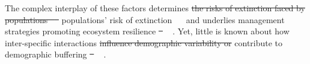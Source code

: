 \documentclass[lineno, sn-basic]{sn-jnl}%
\providecommand{\DIFadd}[1]{{\protect\color{blue}#1}} %
\providecommand{\DIFdel}[1]{{\protect\color{red}\protect\scriptsize\sout{#1}}}
\providecommand{\DIFadd}[1]{{\protect\color{blue}\uwave{#1}}} %
\providecommand{\DIFdel}[1]{{\protect\color{red}\sout{#1}}}                      %
\providecommand{\DIFaddbegin}{} %
\providecommand{\DIFaddend}{} %
\providecommand{\DIFdelbegin}{} %
\providecommand{\DIFdelend}{} %
\newcommand{\DIFscaledelfig}{0.5}
\newlength{\DIFdelgraphicswidth} %
\newlength{\DIFdelgraphicsheight} %
\newcommand{\DIFaddincludegraphics}[2][]{{\color{blue}\fbox{\DIFOincludegraphics[#1]{#2}}}} %
\newcommand{\DIFdelincludegraphics}[2][]{%
\sbox{\DIFdelgraphicsbox}{\DIFOincludegraphics[#1]{#2}}%
\settoboxwidth{\DIFdelgraphicswidth}{\DIFdelgraphicsbox} %
\settoboxtotalheight{\DIFdelgraphicsheight}{\DIFdelgraphicsbox} %
\scalebox{\DIFscaledelfig}{%
\parbox[b]{\DIFdelgraphicswidth}{\usebox{\DIFdelgraphicsbox}\\[-\baselineskip] \rule{\DIFdelgraphicswidth}{0em}}\llap{\resizebox{\DIFdelgraphicswidth}{\DIFdelgraphicsheight}{%
\setlength{\unitlength}{\DIFdelgraphicswidth}%
\begin{picture}(1,1)%
\thicklines\linethickness{2pt} %
{\color[rgb]{1,0,0}\put(0,0){\framebox(1,1){}}}%
{\color[rgb]{1,0,0}\put(0,0){\line( 1,1){1}}}%
{\color[rgb]{1,0,0}\put(0,1){\line(1,-1){1}}}%
\end{picture}%
}\hspace*{3pt}}} %
} %
\DeclareRobustCommand{\DIFaddbegin}{\DIFOaddbegin \let\includegraphics\DIFaddincludegraphics} %
\DeclareRobustCommand{\DIFaddend}{\DIFOaddend \let\includegraphics\DIFOincludegraphics} %
\DeclareRobustCommand{\DIFdelbegin}{\DIFOdelbegin \let\includegraphics\DIFdelincludegraphics} %
\DeclareRobustCommand{\DIFdelend}{\DIFOaddend \let\includegraphics\DIFOincludegraphics} %
\begin{document}
The complex interplay of these factors determines \DIFdelbegin \DIFdel{the risks of extinction faced by populations \mbox{%
\cite{menges2000applications} }\hspace{0pt}%
}\DIFdelend \DIFaddbegin \DIFadd{populations' risk of extinction \mbox{%
\citep{menges2000applications} }\hspace{0pt}%
}\DIFaddend and underlies management strategies promoting ecosystem resilience \DIFdelbegin \DIFdel{\mbox{%
\cite{kuparinen2016fishing}}\hspace{0pt}%
}\DIFdelend \DIFaddbegin \DIFadd{\mbox{%
\citep{kuparinen2016fishing}}\hspace{0pt}%
}\DIFaddend . 
Yet, little is known about how inter-specific interactions \DIFdelbegin \DIFdel{influence demographic variability or }\DIFdelend contribute to demographic buffering \DIFdelbegin \DIFdel{\mbox{%
\cite{hilde_demographic_2020}}\hspace{0pt}%
}\DIFdelend \DIFaddbegin \DIFadd{\mbox{%
\citep{hilde_demographic_2020}}\hspace{0pt}%
}\DIFaddend . 
\end{document}
